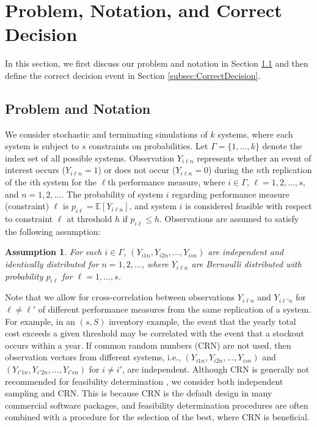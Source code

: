 \documentclass[11pt]{article}
\newcommand{\E}{\mathbb{E}}
\newtheorem{assumption}{Assumption}
\begin{document}
\section{Problem, Notation, and Correct Decision}
\label{sec:background}
In this section, we first discuss our problem and notation in Section \ref{subsec:Problem} and then define the correct decision event in Section \ref{subsec:CorrectDecision}. 

\subsection{Problem and Notation}
\label{subsec:Problem}

We consider stochastic and terminating simulations of $k$ systems, where each system is subject to $s$ constraints on probabilities. Let $\Gamma=\{1,\ldots,k\}$ denote the index set of all possible systems. Observation $Y_{i\ell n}$ represents whether an event of interest occurs ($Y_{i\ell n}=1$) or does not occur ($Y_{i\ell n} = 0$) during the $n$th replication of the $i$th system for the $\ell$th performance measure, where $i\in \Gamma$, $\ell = 1, 2, \ldots, s$, and $n = 1, 2, \ldots$. The probability of system $i$ regarding performance measure (constraint) $\ell$ is $p_{i\ell} = \E[Y_{i\ell n}]$, and system $i$ is considered feasible with respect to constraint $\ell$ at threshold $h$ if $p_{i\ell}\leq h$. Observations are assumed to satisfy the following assumption:
\begin{assumption} 
\label{assump:bern} 
For each $i \in \Gamma$, $(Y_{i1n}, Y_{i2n}, \ldots, Y_{isn})$ are independent and identically distributed for $n=1,2,\ldots$, where $Y_{i\ell n}$ are Bernoulli distributed with probability $p_{i\ell}$ for $\ell=1,\ldots,s$.
\end{assumption}

Note that we allow for cross-correlation between observations $Y_{i\ell n}$ and $Y_{i\ell' n}$ for $\ell \neq \ell'$ of different performance measures from the same replication of a system. For example, in an $(s, S)$ inventory example, the event that the yearly total cost exceeds a given threshold may be correlated with the event that a stockout occurs within a year. If common random numbers (CRN) are not used, then observation vectors from different systems, i.e., $(Y_{i1n}, Y_{i2n}, \ldots, Y_{isn})$ and $(Y_{i'1n}, Y_{i'2n}, \ldots, Y_{i'sn})$ for $i \neq i'$, are independent. 
Although CRN is generally not recommended for feasibility determination \citep{zhou2022finding}, we consider both independent sampling and CRN. This is because CRN is the default design in many commercial software packages, and feasibility determination procedures are often combined with a procedure for the selection of the best, where CRN is beneficial. 
\end{document}
